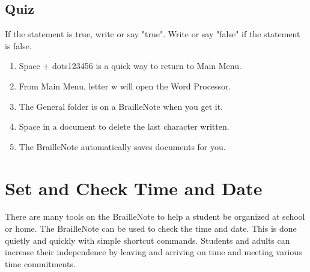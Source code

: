 \documentclass[10pt,letterpaper,twoside]{report}
\begin{document}
\subsection{Quiz}
If the statement is true, write or say "true". Write or say "false" if the statement is false.
\begin{enumerate}
	\item Space + dots123456 is a quick way to return to Main Menu.
	\item From Main Menu, letter w will open the Word Processor.
	\item The General folder is on a BrailleNote when you get it.
	\item Space in a document to delete the last character written.
	\item The BrailleNote automatically saves documents for you.
\end{enumerate}

\clearpage
\section*{Set and Check Time and Date}
There are many tools on the BrailleNote to help a student be organized at school or home. The BrailleNote can be used to check the time and date. This is done quietly and quickly with simple shortcut commands. Students and adults can increase their independence by leaving and arriving on time and meeting various time commitments.
\end{document}
